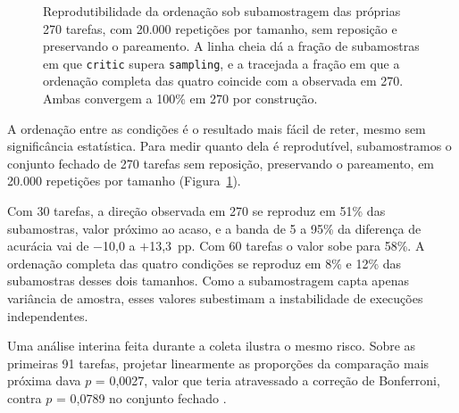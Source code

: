 \documentclass[letterpaper]{article} %
\newcommand{\An}{270}
\newcommand{\SubRep}{20.000}
\newcommand{\SubNa}{30} \newcommand{\SubNb}{60}
\newcommand{\SubDirA}{51} \newcommand{\SubDirAN}{51.4}
\newcommand{\SubDirB}{58} \newcommand{\SubDirBN}{58.2}
\newcommand{\SubDirCN}{62.9} \newcommand{\SubDirDN}{71.1} \newcommand{\SubDirEN}{79.9}
\newcommand{\SubOrdA}{8}  \newcommand{\SubOrdAN}{7.7}
\newcommand{\SubOrdB}{12} \newcommand{\SubOrdBN}{11.6}
\newcommand{\SubOrdCN}{17.4} \newcommand{\SubOrdDN}{27.2} \newcommand{\SubOrdEN}{41.6}
\newcommand{\SubBandaAlo}{\mbox{$-$10{,}0}} \newcommand{\SubBandaAhi}{\mbox{$+$13{,}3}}
\newcommand{\ProjN}{91} \newcommand{\ProjPextrapolado}{0{,}0027}
\newcommand{\ProjPfinal}{0{,}0789}
\begin{document}
\begin{figure}[t]
\centering
{}
\caption{Reprodutibilidade da ordenação sob subamostragem das próprias \An{}
tarefas, com \SubRep{} repetições por tamanho, sem reposição e preservando o
pareamento. A linha cheia dá a fração de subamostras em que \texttt{critic}
supera \texttt{sampling}, e a tracejada a fração em que a ordenação completa das
quatro coincide com a observada em \An{}. Ambas convergem a 100\% em \An{} por
construção.}
\label{fig:estabilidade}
\end{figure}

A ordenação entre as condições é o resultado mais fácil de reter, mesmo sem
significância estatística. Para medir quanto dela é reprodutível, subamostramos o
conjunto fechado de \An{} tarefas sem reposição, preservando o pareamento, em
\SubRep{} repetições por tamanho (Figura~\ref{fig:estabilidade}).

Com \SubNa{} tarefas, a direção observada em \An{} se reproduz em \SubDirA\% das
subamostras, valor próximo ao acaso, e a banda de 5 a 95\% da diferença de
acurácia vai de \SubBandaAlo{} a \SubBandaAhi~pp. Com \SubNb{} tarefas o valor
sobe para \SubDirB\%. A ordenação completa das quatro condições se reproduz em
\SubOrdA\% e \SubOrdB\% das subamostras desses dois tamanhos. Como a subamostragem
capta apenas variância de amostra, esses valores subestimam a instabilidade de
execuções independentes.

Uma análise interina feita durante a coleta ilustra o mesmo risco. Sobre as
primeiras \ProjN{} tarefas, projetar linearmente as proporções da comparação mais
próxima dava $p$ = \ProjPextrapolado{}, valor que teria atravessado a correção de
Bonferroni, contra $p$ = \ProjPfinal{} no conjunto fechado \citep{button:13}.
\end{document}
